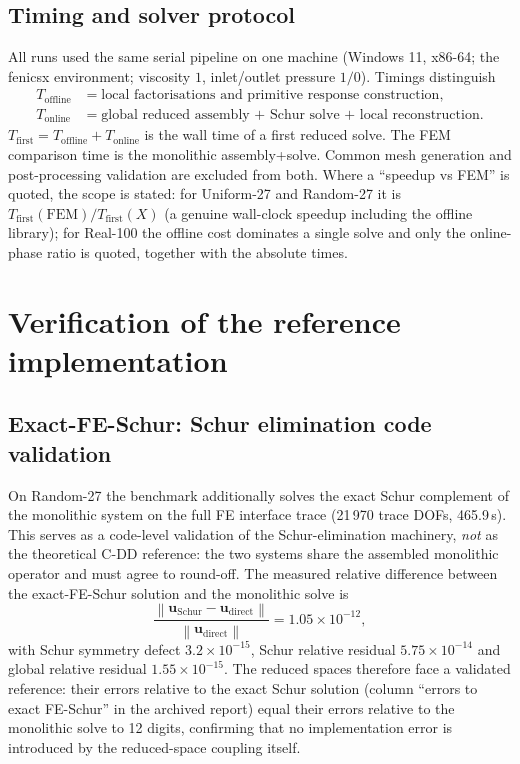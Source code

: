 \documentclass[11pt,a4paper]{article}
\newcommand{\vel}{\bm{u}}
\newcommand{\norm}[1]{\left\|#1\right\|}
\begin{document}
\subsection{Timing and solver protocol}
\label{sec:timing}

All runs used the same serial pipeline on one machine (Windows 11,
x86-64; the fenicsx environment; viscosity $1$, inlet/outlet pressure
$1/0$).  Timings distinguish
\begin{align}
  T_{\mathrm{offline}} &= \text{local factorisations and primitive
    response construction},\\
  T_{\mathrm{online}} &= \text{global reduced assembly + Schur solve +
    local reconstruction}.
\end{align}
$T_{\mathrm{first}} = T_{\mathrm{offline}} + T_{\mathrm{online}}$ is the
wall time of a first reduced solve.  The FEM comparison time is the
monolithic assembly+solve.  Common mesh generation and post-processing
validation are excluded from both.  Where a ``speedup vs FEM'' is
quoted, the scope is stated: for Uniform-27 and Random-27 it is
$T_{\mathrm{first}}(\mathrm{FEM})/T_{\mathrm{first}}(X)$ (a genuine
wall-clock speedup including the offline library); for Real-100 the
offline cost dominates a single solve and only the online-phase ratio
is quoted, together with the absolute times.

\section{Verification of the reference implementation}
\label{sec:verification}

\subsection{Exact-FE-Schur: Schur elimination code validation}
\label{sec:exactschur}

On Random-27 the benchmark additionally solves the exact Schur
complement of the monolithic system on the full FE interface trace
(21\,970 trace DOFs, 465.9\,s).  This serves as a code-level validation
of the Schur-elimination machinery, \emph{not} as the theoretical C-DD
reference: the two systems share the assembled monolithic operator and
must agree to round-off.  The measured relative difference between the
exact-FE-Schur solution and the monolithic solve is
\begin{equation}
  \frac{\norm{\vel_{\mathrm{Schur}}-\vel_{\mathrm{direct}}}}
       {\norm{\vel_{\mathrm{direct}}}} = 1.05\times10^{-12},
\end{equation}
with Schur symmetry defect $3.2\times10^{-15}$, Schur relative residual
$5.75\times10^{-14}$ and global relative residual $1.55\times10^{-15}$.
The reduced spaces therefore face a validated reference: their errors
relative to the exact Schur solution (column ``errors to exact
FE-Schur'' in the archived report) equal their errors relative to the
monolithic solve to 12 digits, confirming that no implementation error
is introduced by the reduced-space coupling itself.
\end{document}
